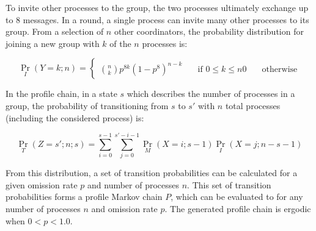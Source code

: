To invite other processes to the group, the two processes ultimately exchange up to 8 messages.
In a round, a single process can invite many other processes to its group.
From a selection of $n$ other coordinators, the probability distribution for joining a new group with $k$ of the $n$ processes is:

\[
	\Pr_{I}(Y=k; n) =
	\begin{cases}
		\binom{n}{k} p^{8k}(1-p^8)^{n-k} & \quad \text{if } 0 \leq k \leq n
		0                                & \quad \text{otherwise}
	\end{cases}
\]

In the profile chain, in a state $s$ which describes the number of processes in a group, the probability of transitioning from $s$ to $s'$ with $n$ total processes (including the considered process) is:

\[ \Pr_{T}(Z=s'; n; s) = \sum_{i=0}^{s-1} \sum_{j=0}^{s'-i-1} \Pr_{M}(X=i; s-1) \Pr_{I}(X=j; n-s-1) \]

From this distribution, a set of transition probabilities can be calculated for a given omission rate $p$ and number of processes $n$.
This set of transition probabilities forms a profile Markov chain $P$, which can be evaluated to for any number of processes $n$ and omission rate $p$.
The generated profile chain is ergodic when $0<p<1.0$.


